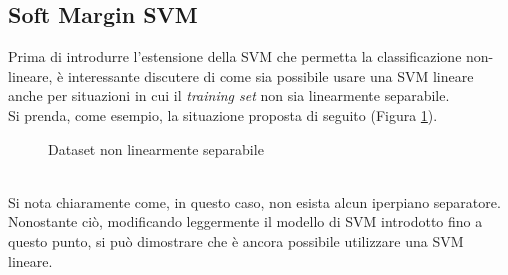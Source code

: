 \subsection{Soft Margin SVM}
Prima di introdurre l'estensione della SVM che permetta la classificazione non-lineare, è interessante discutere di come sia possibile usare una SVM lineare anche per situazioni in cui il \emph{training set} non sia linearmente separabile.\\
Si prenda, come esempio, la situazione proposta di seguito (Figura \ref{fig:Dataset_nonseparabile}).
 \begin{figure}[!ht]
 \center
{}
    \caption{Dataset non linearmente separabile}
    \label{fig:Dataset_nonseparabile}
  \end{figure}
\\
Si nota chiaramente come, in questo caso, non esista alcun iperpiano separatore. 
Nonostante ciò, modificando leggermente il modello di SVM introdotto fino a questo punto, si può dimostrare che è ancora possibile utilizzare una SVM lineare.\\

